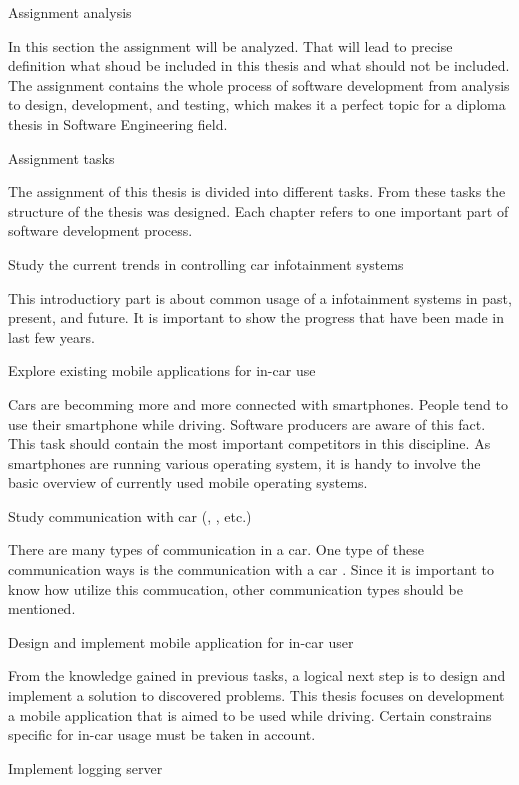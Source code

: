 

\sec Assignment analysis

In this section the assignment will be analyzed. That will lead to precise definition what shoud be included in this thesis and what should not be included. The assignment contains the whole process of software development from analysis to design, development, and testing, which makes it a perfect topic for a diploma thesis in Software Engineering field.

\secc Assignment tasks

The assignment of this thesis is divided into different tasks. From these tasks the structure of the thesis was designed. Each chapter refers to one important part of software development process.

\seccc Study the current trends in controlling car infotainment systems

This introductiory part is about common usage of a infotainment systems in past, present, and future. It is important to show the progress that have been made in last few years. 

\seccc Explore existing mobile applications for in-car use

Cars are becomming more and more connected with smartphones. People tend to use their smartphone while driving. Software producers are aware of this fact. This task should contain the most important competitors in this discipline. As smartphones are running various operating system, it is handy to involve the basic overview of currently used mobile operating systems.

\seccc Study communication with car  (, , etc.)

There are many types of communication in a car. One type of these communication ways is the communication with a car . Since it is important to know how utilize this commucation, other communication types should be mentioned.

\seccc Design and implement mobile application for in-car user

From the knowledge gained in previous tasks, a logical next step is to design and implement a solution to discovered problems. This thesis focuses on development a mobile application that is aimed to be used while driving. Certain constrains specific for in-car usage must be taken in account.

\seccc Implement logging server

